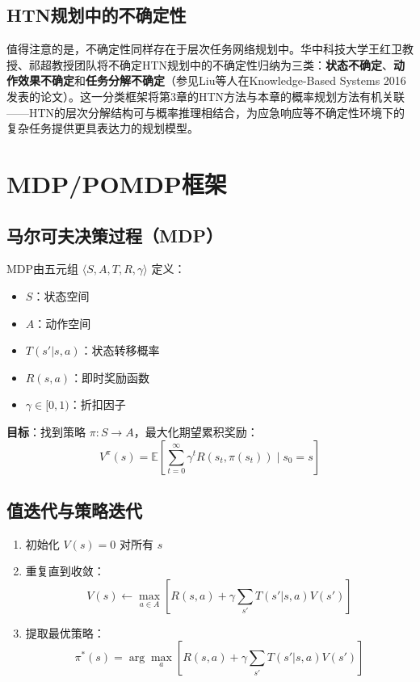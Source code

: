 \subsection{HTN规划中的不确定性}

值得注意的是，不确定性同样存在于层次任务网络规划中。华中科技大学王红卫教授、祁超教授团队将不确定HTN规划中的不确定性归纳为三类：\textbf{状态不确定}、\textbf{动作效果不确定}和\textbf{任务分解不确定}（参见Liu等人在Knowledge-Based Systems 2016发表的论文）。这一分类框架将第3章的HTN方法与本章的概率规划方法有机关联——HTN的层次分解结构可与概率推理相结合，为应急响应等不确定性环境下的复杂任务提供更具表达力的规划模型。

\section{MDP/POMDP框架}

\subsection{马尔可夫决策过程（MDP）}

\begin{definition}[MDP]
MDP由五元组 $\langle S, A, T, R, \gamma \rangle$ 定义：
\begin{itemize}
  \item $S$：状态空间
  \item $A$：动作空间
  \item $T(s'|s,a)$：状态转移概率
  \item $R(s,a)$：即时奖励函数
  \item $\gamma \in [0,1)$：折扣因子
\end{itemize}
\end{definition}

\textbf{目标}：找到策略 $\pi: S \rightarrow A$，最大化期望累积奖励：
\[ V^\pi(s) = \mathbb{E}\left[\sum_{t=0}^{\infty} \gamma^t R(s_t, \pi(s_t)) \mid s_0 = s\right] \]

\subsection{值迭代与策略迭代}

\begin{algbox}[值迭代算法]
\begin{enumerate}
  \item 初始化 $V(s) = 0$ 对所有 $s$
  \item 重复直到收敛：
  \[ V(s) \leftarrow \max_{a \in A} \left[ R(s,a) + \gamma \sum_{s'} T(s'|s,a) V(s') \right] \]
  \item 提取最优策略：
  \[ \pi^*(s) = \arg\max_{a} \left[ R(s,a) + \gamma \sum_{s'} T(s'|s,a) V(s') \right] \]
\end{enumerate}
\end{algbox}

